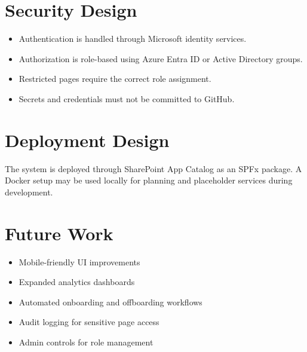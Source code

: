 \documentclass[12pt]{article}
\begin{document}
\section{Security Design}
\begin{itemize}
  \item Authentication is handled through Microsoft identity services.
  \item Authorization is role-based using Azure Entra ID or Active Directory groups.
  \item Restricted pages require the correct role assignment.
  \item Secrets and credentials must not be committed to GitHub.
\end{itemize}

\section{Deployment Design}
The system is deployed through SharePoint App Catalog as an SPFx package. A Docker setup may be used locally for planning and placeholder services during development.

\section{Future Work}
\begin{itemize}
  \item Mobile-friendly UI improvements
  \item Expanded analytics dashboards
  \item Automated onboarding and offboarding workflows
  \item Audit logging for sensitive page access
  \item Admin controls for role management
\end{itemize}
\end{document}
